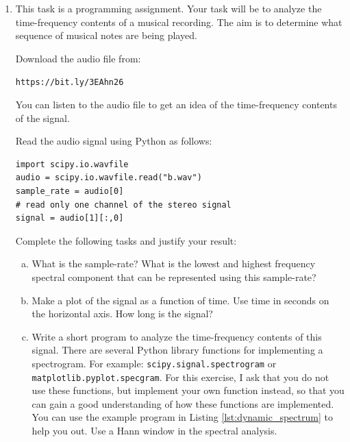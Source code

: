 \begin{enumerate}
  \item This task is a programming assignment. Your task will be to analyze
        the time-frequency contents of a musical recording. The aim is to
        determine what sequence of musical notes are being played.

        Download the audio file from:
        \begin{center}
          \verb|https://bit.ly/3EAhn26|
        \end{center}
        You can listen to the audio file to get an idea of the time-frequency
        contents of the signal.

        Read the audio signal using Python as follows:
        \begin{verbatim}
import scipy.io.wavfile
audio = scipy.io.wavfile.read("b.wav")
sample_rate = audio[0]
# read only one channel of the stereo signal
signal = audio[1][:,0]
\end{verbatim}

        Complete the following tasks and justify your result:
        \begin{enumerate}[a)]

          \item What is the sample-rate? What is the lowest and highest
                frequency spectral component that can be represented using this
                sample-rate?

          \item Make a plot of the signal as a function of time. Use time in
                seconds on the horizontal axis. How long is the signal?

          \item Write a short program to analyze the time-frequency contents of
                this signal. There are several Python library functions for
                implementing a spectrogram. For example:
                \verb|scipy.signal.spectrogram| or
                \verb|matplotlib.pyplot.specgram|. For this exercise, I ask that you
                do not use these functions, but implement your own function instead,
                so that you can gain a good understanding of how these functions are
                implemented. You can use the example program in Listing
                \ref{lst:dynamic_spectrum} to help you out. Use a Hann window in the
                spectral analysis.


\end{enumerate}
\end{enumerate}
